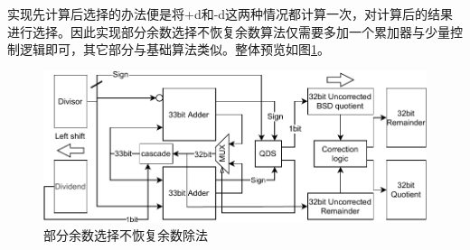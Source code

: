 \documentclass[UTF8,12pt,punct=kaiming,fontset=none]{article}
\begin{document}
    实现先计算后选择的办法便是将+d和-d这两种情况都计算一次，对计算后的结果进行选择。因此实现部分余数选择不恢复余数算法仅需要多加一个累加器与少量控制逻辑即可，其它部分与基础算法类似。整体预览如图\ref{fig6}。
    \begin{figure}[h]
	    \centering
	    \includegraphics[scale=1]{div.pdf}
	    \caption{部分余数选择不恢复余数除法}
	    \label{fig6}
    \end{figure}
\end{document}
